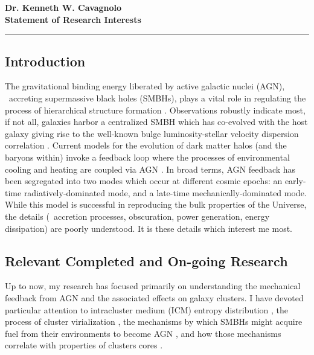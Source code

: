 \documentclass[12pt]{article}
\begin{document}
\begin{center}
{\large \textbf{Dr. Kenneth W. Cavagnolo\\Statement of Research Interests}}
\rule{17cm}{2pt}
\end{center}
\normalsize

\subsection*{Introduction}
The gravitational binding energy liberated by active galactic nuclei
(AGN), \ie\ accreting supermassive black holes (SMBHs), plays a vital
role in regulating the process of hierarchical structure formation
\cite[\eg][]{perseus1, croton06, bower06, saro06, sijacki07,
birzan08}. Observations robustly indicate most, if not all, galaxies
harbor a centralized SMBH which has co-evolved with the host galaxy
giving rise to the well-known bulge luminosity-stellar velocity
dispersion correlation \cite{1995ARA&A..33..581K, magorrian}. Current
models for the evolution of dark matter halos (and the baryons within)
invoke a feedback loop where the processes of environmental cooling
and heating are coupled via AGN \cite{2002MNRAS.333..145N,
mcnamrev}. In broad terms, AGN feedback has been segregated into two
modes which occur at different cosmic epochs: an early-time
radiatively-dominated mode, and a late-time mechanically-dominated
mode. While this model is successful in reproducing the bulk
properties of the Universe, the details (\ie\ accretion processes,
obscuration, power generation, energy dissipation) are poorly
understood. It is these details which interest me most.

\subsection*{Relevant Completed and On-going Research}
Up to now, my research has focused primarily on understanding the
mechanical feedback from AGN and the associated effects on galaxy
clusters. I have devoted particular attention to intracluster medium
(ICM) entropy distribution \cite{accept}, the process of cluster
virialization \cite{xrayband}, the mechanisms by which SMBHs might
acquire fuel from their environments to become AGN \cite{conduction},
and how those mechanisms correlate with properties of clusters cores
\cite{haradent}.
\end{document}
